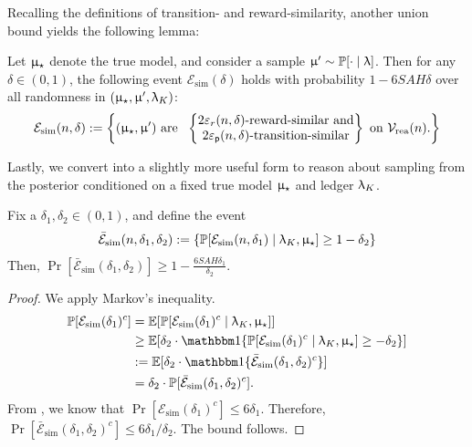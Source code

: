 Recalling the definitions of transition- and reward-similarity, another union bound yields the following lemma:
\newcommand{\Esim}{\mathcal{E}_{\mathrm{sim}}}
\newcommand{\Ebarsim}{\bar{\mathcal{E}}_{\mathrm{sim}}}
\begin{lemma}\label{lem:Esim} Let $\upmu_{\star}$ denote the true model, and consider a sample $\upmu' \sim \operatorname{\mathbb{P}}[\cdot \mid \uplambda]$. Then for any $\delta \in (0,1)$, the following event $\Esim(\delta)$ holds with probability $1 - 6SAH\delta$ over all randomness in $(\upmu_{\star},\upmu',\uplambda_K)$:
\begin{align}
\Esim(n,\delta) := \left\{(\modst,\model') \text{ are }\,\, \left\{\begin{matrix} 2\epsr(n,\delta)\text{-reward-similar and}\\
2\epsp(n,\delta)\text{-transition-similar}\\
\end{matrix}\right\} \text{ on } \Vreach(n).\right\}
\end{align}
\end{lemma}

Lastly, we convert  into a slightly more useful form to reason about sampling from the posterior conditioned on a fixed true model $\upmu_{\star}$ and ledger $\uplambda_K$.
\begin{lemma}\label{lem:Esim_two} Fix a $\delta_1,\delta_2 \in (0,1)$, and define the event
\begin{align*}
\Ebarsim(n,\delta_1,\delta_2) := \{\Pr[\Esim(n,\delta_1) \mid \ledger_K,\modst] \ge 1 - \delta_2 \}
\end{align*}
Then, $\Pr[\Ebarsim(\delta_1,\delta_2)] \ge 1 - \frac{6SAH\delta_1}{\delta_2}$.
\end{lemma}
\begin{proof} We apply Markov's inequality.
\begin{align*}
\Pr[\Esim(\delta_1)^c] &= \Exp[\Pr[\Esim(\delta_1)^c \mid \ledger_K,\modst] ]\\
&\ge  \Exp[\delta_2 \cdot\ind\{\Pr[\Esim(\delta_1)^c \mid \ledger_K,\modst] \ge - \delta_2\}]\\
&:=  \Exp[\delta_2 \cdot \ind\{\Ebarsim(\delta_1,\delta_2)^c\}]\\
&= \delta_2 \cdot\Pr[\Ebarsim(\delta_1,\delta_2)^c].
\end{align*}
From , we know that $\Pr[\Esim(\delta_1)^c] \le 6\delta_1$. Therefore, $\Pr[\Ebarsim(\delta_1,\delta_2)^c] \le 6\delta_1/\delta_2$. The bound follows.
\end{proof}

